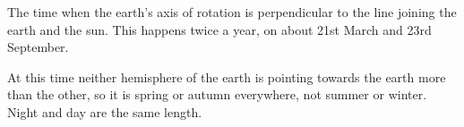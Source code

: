 The time when the earth's axis of rotation is perpendicular
to the line joining the earth and the sun. This happens twice a
year, on about 21st March and 23rd September.
\par
At this time neither hemisphere of the earth is pointing towards
the earth more than the other, so it is spring or autumn everywhere,
not summer or winter. Night and day are the same length.